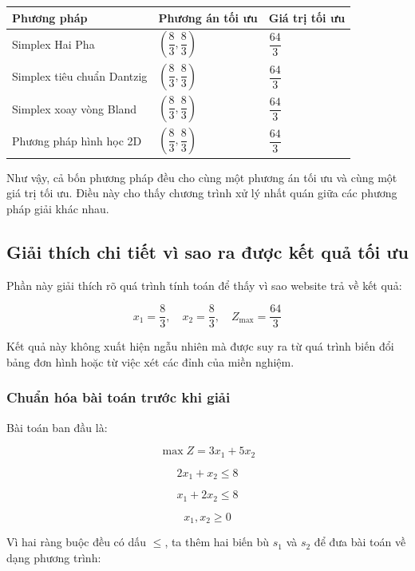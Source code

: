 \documentclass[14pt, a4paper]{extarticle}
\renewcommand{\frac}{\dfrac}
\begin{document}
    \begin{longtable}{|p{5cm}|p{4cm}|p{4cm}|}
    \hline
    \textbf{Phương pháp} & \textbf{Phương án tối ưu} & \textbf{Giá trị tối ưu} \\
    \hline
    Simplex Hai Pha & $\left(\frac{8}{3}, \frac{8}{3}\right)$ & $\frac{64}{3}$ \\
    \hline
    Simplex tiêu chuẩn Dantzig & $\left(\frac{8}{3}, \frac{8}{3}\right)$ & $\frac{64}{3}$ \\
    \hline
    Simplex xoay vòng Bland & $\left(\frac{8}{3}, \frac{8}{3}\right)$ & $\frac{64}{3}$ \\
    \hline
    Phương pháp hình học 2D & $\left(\frac{8}{3}, \frac{8}{3}\right)$ & $\frac{64}{3}$ \\
    \hline
    \end{longtable}
    
    Như vậy, cả bốn phương pháp đều cho cùng một phương án tối ưu và cùng một giá trị tối ưu. Điều này cho thấy chương trình xử lý nhất quán giữa các phương pháp giải khác nhau.
    
    \subsection{Giải thích chi tiết vì sao ra được kết quả tối ưu}
    
    Phần này giải thích rõ quá trình tính toán để thấy vì sao website trả về kết quả:
    
    \[
    x_1 = \frac{8}{3}, \quad x_2 = \frac{8}{3}, \quad Z_{\max} = \frac{64}{3}
    \]
    
    Kết quả này không xuất hiện ngẫu nhiên mà được suy ra từ quá trình biến đổi bảng đơn hình hoặc từ việc xét các đỉnh của miền nghiệm.
    
    \subsubsection{Chuẩn hóa bài toán trước khi giải}
    
    Bài toán ban đầu là:
    
    \[
    \max Z = 3x_1 + 5x_2
    \]
    
    \[
    2x_1 + x_2 \leq 8
    \]
    
    \[
    x_1 + 2x_2 \leq 8
    \]
    
    \[
    x_1,x_2 \geq 0
    \]
    
    Vì hai ràng buộc đều có dấu $\leq$, ta thêm hai biến bù $s_1$ và $s_2$ để đưa bài toán về dạng phương trình:
    
\end{document}
